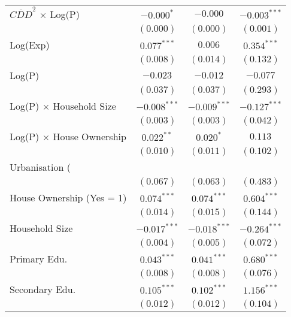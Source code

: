 \begin{table}[H]
\begin{center}
\begin{tabular}{l c c c}
$\overline{CDD}^2$ $\times$ Log(P)   & $-0.000^{*}$   & $-0.000$       & $-0.003^{***}$   \\
                                     & $(0.000)$      & $(0.000)$      & $(0.001)$        \\
Log(Exp)                             & $0.077^{***}$  & $0.006$        & $0.354^{***}$    \\
                                     & $(0.008)$      & $(0.014)$      & $(0.132)$        \\
Log(P)                               & $-0.023$       & $-0.012$       & $-0.077$         \\
                                     & $(0.037)$      & $(0.037)$      & $(0.293)$        \\
Log(P) $\times$ Household Size       & $-0.008^{***}$ & $-0.009^{***}$ & $-0.127^{***}$   \\
                                     & $(0.003)$      & $(0.003)$      & $(0.042)$        \\
Log(P) $\times$ House Ownership      & $0.022^{**}$   & $0.020^{*}$    & $0.113$          \\
                                     & $(0.010)$      & $(0.011)$      & $(0.102)$        \\
Urbanisation (\\%
                                     & $(0.067)$      & $(0.063)$      & $(0.483)$        \\
House Ownership (Yes = 1)            & $0.074^{***}$  & $0.074^{***}$  & $0.604^{***}$    \\
                                     & $(0.014)$      & $(0.015)$      & $(0.144)$        \\
Household Size                       & $-0.017^{***}$ & $-0.018^{***}$ & $-0.264^{***}$   \\
                                     & $(0.004)$      & $(0.005)$      & $(0.072)$        \\
Primary Edu.                         & $0.043^{***}$  & $0.041^{***}$  & $0.680^{***}$    \\
                                     & $(0.008)$      & $(0.008)$      & $(0.076)$        \\
Secondary Edu.                       & $0.105^{***}$  & $0.102^{***}$  & $1.156^{***}$    \\
                                     & $(0.012)$      & $(0.012)$      & $(0.104)$        \\

\end{tabular}
\end{center}
\end{table}
